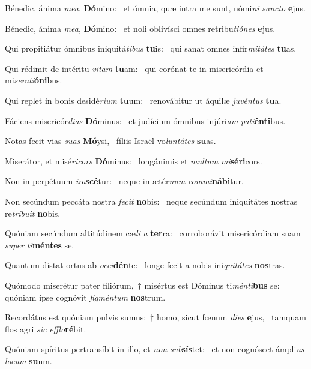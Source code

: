\item Bénedic, ánima \textit{mea}, \textbf{Dó}mino:~\psstar{} et ómnia, quæ intra me sunt, nómi\textit{ni} \textit{sancto} \textbf{e}jus.
\item Bénedic, ánima \textit{mea}, \textbf{Dó}mino:~\psstar{} et noli oblivísci omnes retribu\textit{tiónes} \textbf{e}jus.
\item Qui propitiátur ómnibus iniquitá\textit{tibus} \textbf{tu}is:~\psstar{} qui sanat omnes infir\textit{mitátes} \textbf{tu}as.
\item Qui rédimit de intéritu \textit{vitam} \textbf{tu}am:~\psstar{} qui corónat te in misericórdia et mi\textit{serati}\textbf{ó}\textbf{ni}bus.
\item Qui replet in bonis desidé\textit{rium} \textbf{tu}um:~\psstar{} renovábitur ut áquilæ \textit{juvéntus} \textbf{tu}a.
\item Fáciens misericór\textit{dias} \textbf{Dó}mi\-nus:~\psstar{} et judícium ómnibus injúri\textit{am} \textit{pati}\textbf{én}\textbf{ti}bus.
\item Notas fecit vias \textit{suas} \textbf{Mó}ysi,~\psstar{} fíliis Israël vo\textit{luntátes} \textbf{su}as.
\item Miserátor, et misé\textit{ricors} \textbf{Dó}minus:~\psstar{} longánimis et \textit{multum} \textit{mi}\textbf{sé}\textbf{ri}cors.
\item Non in perpétuum \textit{ira}\textbf{scé}tur:~\psstar{} neque in ætér\textit{num} \textit{commi}\textbf{ná}\textbf{bi}tur.
\item Non secúndum peccáta nostra \textit{fecit} \textbf{no}bis:~\psstar{} neque secúndum iniquitátes nostras re\textit{tríbuit} \textbf{no}bis.
\item Quóniam secúndum altitúdinem cæ\textit{li} \textit{a} \textbf{ter}ra:~\psstar{} corroborávit misericórdiam suam \textit{super} \textit{ti}\textbf{mén}\textbf{tes} se.
\item Quantum distat ortus ab \textit{occi}\textbf{dén}te:~\psstar{} longe fecit a nobis ini\textit{quitátes} \textbf{nos}tras.
\item Quómodo miserétur pater filiórum,~† misértus est Dóminus ti\textit{ménti}\textbf{bus} se:~\psstar{} quóniam ipse cognóvit \textit{figméntum} \textbf{nos}trum.
\item Recordátus est quóniam pulvis sumus:~† homo, sicut fœnum \textit{dies} \textbf{e}jus,~\psstar{} tamquam flos agri \textit{sic} \textit{efflo}\textbf{ré}bit.
\item Quóniam spíritus pertransíbit in illo, et \textit{non} \textit{sub}\textbf{sís}tet:~\psstar{} et non cognóscet ámpli\textit{us} \textit{locum} \textbf{su}um.

